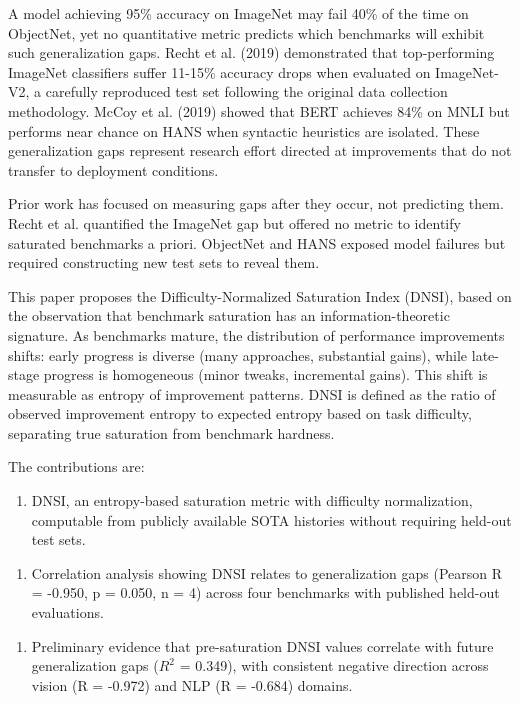 
A model achieving 95\% accuracy on ImageNet may fail 40\% of the time on ObjectNet, yet no quantitative metric predicts which benchmarks will exhibit such generalization gaps. Recht et al. (2019) demonstrated that top-performing ImageNet classifiers suffer 11-15\% accuracy drops when evaluated on ImageNet-V2, a carefully reproduced test set following the original data collection methodology. McCoy et al. (2019) showed that BERT achieves 84\% on MNLI but performs near chance on HANS when syntactic heuristics are isolated. These generalization gaps represent research effort directed at improvements that do not transfer to deployment conditions.

Prior work has focused on measuring gaps after they occur, not predicting them. Recht et al. quantified the ImageNet gap but offered no metric to identify saturated benchmarks a priori. ObjectNet and HANS exposed model failures but required constructing new test sets to reveal them.

This paper proposes the Difficulty-Normalized Saturation Index (DNSI), based on the observation that benchmark saturation has an information-theoretic signature. As benchmarks mature, the distribution of performance improvements shifts: early progress is diverse (many approaches, substantial gains), while late-stage progress is homogeneous (minor tweaks, incremental gains). This shift is measurable as entropy of improvement patterns. DNSI is defined as the ratio of observed improvement entropy to expected entropy based on task difficulty, separating true saturation from benchmark hardness.

The contributions are:

\begin{enumerate}
\item DNSI, an entropy-based saturation metric with difficulty normalization, computable from publicly available SOTA histories without requiring held-out test sets.
\end{enumerate}

\begin{enumerate}
\item Correlation analysis showing DNSI relates to generalization gaps (Pearson R = -0.950, p = 0.050, n = 4) across four benchmarks with published held-out evaluations.
\end{enumerate}

\begin{enumerate}
\item Preliminary evidence that pre-saturation DNSI values correlate with future generalization gaps ($R^2$ = 0.349), with consistent negative direction across vision (R = -0.972) and NLP (R = -0.684) domains.
\end{enumerate}
